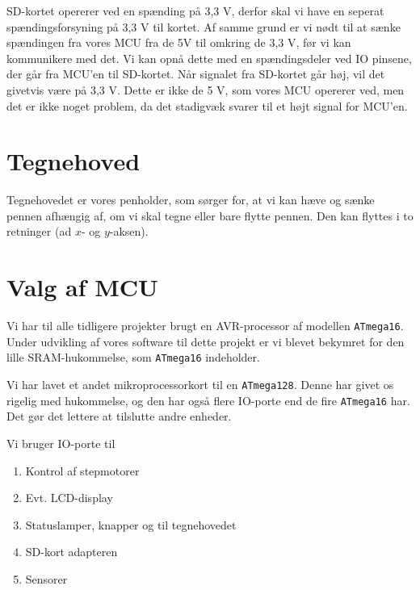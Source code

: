 SD-kortet opererer ved en spænding på 3,3 V, derfor skal vi have en
seperat spændingsforsyning på 3,3 V til kortet. Af samme grund er vi
nødt til at sænke spændingen fra vores MCU fra de 5V til omkring de
3,3 V, før vi kan kommunikere med det. Vi kan opnå dette med en
spændingsdeler ved IO pinsene, der går fra MCU'en til SD-kortet. Når
signalet fra SD-kortet går høj, vil det givetvis være på 3,3 V. Dette
er ikke de 5 V, som vores MCU opererer ved, men det er ikke noget
problem, da det stadigvæk svarer til et højt signal for MCU'en.


\section{Tegnehoved}
\label{sc:d-tegnehoved}
Tegnehovedet er vores penholder, som sørger for, at vi kan hæve og sænke
pennen afhængig af, om vi skal tegne eller bare flytte pennen. Den kan
flyttes i to retninger (ad $x$- og $y$-aksen).

\section{Valg af MCU}
\label{sc:d-mikroprocessor}

Vi har til alle tidligere projekter brugt en AVR-processor af modellen
\texttt{ATmega16}. Under udvikling af vores software til dette projekt
er vi blevet bekymret for den lille SRAM-hukommelse, som
\texttt{ATmega16} indeholder.

Vi har lavet et andet mikroprocessorkort til en
\texttt{ATmega128}. Denne har givet os rigelig med hukommelse, og den
har også flere IO-porte end de fire \texttt{ATmega16} har. Det gør det
lettere at tilslutte andre enheder.

Vi bruger IO-porte til
\begin{enumerate} \firmlist
\item{Kontrol af stepmotorer}
\item{Evt. LCD-display}
\item{Statuslamper, knapper og til tegnehovedet}
\item{SD-kort adapteren}
\item{Sensorer}
\end{enumerate}



